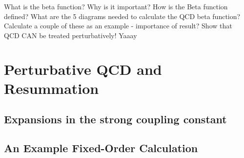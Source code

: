 	What is the beta function? Why is it important? How is the Beta function defined?  What are the 5 diagrams needed to calculate the QCD beta function? Calculate a couple of these as an example - importance of result? Show that QCD CAN be treated perturbatively! Yaaay

\section{Perturbative QCD and Resummation}

	\subsection{Expansions in the strong coupling constant}

	\subsection{An Example Fixed-Order Calculation}

